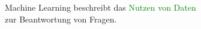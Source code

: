 \documentclass[preview]{standalone}
\begin{document}
\begin{center}
Machine Learning beschreibt das \textcolor{green}{Nutzen von Daten} \\ zur Beantwortung von Fragen.
\end{center}
\end{document}

